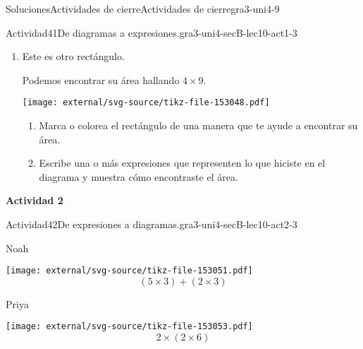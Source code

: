 \documentclass[twoside,10pt,]{article}
\begin{document}
\begin{solutions-section}{Soluciones}{Actividades de cierre}{}{Actividades de cierre}{}{}{gra3-uni4-9}
\begin{activitysolution}{Actividad}{41}{De diagramas a expresiones.}{gra3-uni4-secB-lec10-act1-3}
\begin{enumerate}
\begin{enumerate}
\item{}¿Cómo se relacionan los números de las expresiones de Andre con su diagrama?%
\item{}¿Cómo se relacionan los números de las expresiones de Elena con su diagrama?%
\end{enumerate}
\item{}\begin{sidebyside}{2}{0}{0}{0}%
\begin{sbspanel}{0.5}%
Este es otro rectángulo.%
\par
Podemos encontrar su área hallando \(4 \times 9\).%
\end{sbspanel}%
\begin{sbspanel}{0.5}%
\texttt{[image: external/svg-source/tikz-file-153048.pdf]}
\end{sbspanel}%
\end{sidebyside}%
%
\begin{enumerate}
\item{}Marca o colorea el rectángulo de una manera que te ayude a encontrar su área.%
\item{}Escribe una o más expresiones que representen lo que hiciste en el diagrama y muestra cómo encontraste el área.%
\end{enumerate}
%
\end{enumerate}
\end{activitysolution}%
\par\medskip
\noindent\textbf{\large{}\space\textperiodcentered\space{}Actividad 2}
\begin{activitysolution}{Actividad}{42}{De expresiones a diagramas.}{gra3-uni4-secB-lec10-act2-3}%
\begin{sidebyside}{3}{0.0166666666666667}{0.0166666666666667}{0.0333333333333333}%
\begin{sbspanel}{0.3}%
Noah%
\par
\texttt{[image: external/svg-source/tikz-file-153051.pdf]}
%
\begin{equation*}
(5\times 3)+(2 \times 3)
\end{equation*}
%
\end{sbspanel}%
\begin{sbspanel}{0.3}%
Priya%
\par
\texttt{[image: external/svg-source/tikz-file-153053.pdf]}
%
\begin{equation*}
2 \times (2 \times 6)
\end{equation*}
%
\end{sbspanel}%

\end{sidebyside}
\end{activitysolution}
\end{solutions-section}
\end{document}
